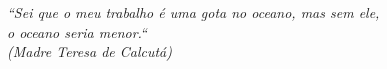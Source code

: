\begin{epigrafe}
    \vspace*{\fill}
	\begin{flushright}
		\textit{``Sei que o meu trabalho é uma gota no oceano, mas sem ele, \\
		o oceano seria menor.``\\
		(Madre Teresa de Calcutá)}
	\end{flushright}
\end{epigrafe}
